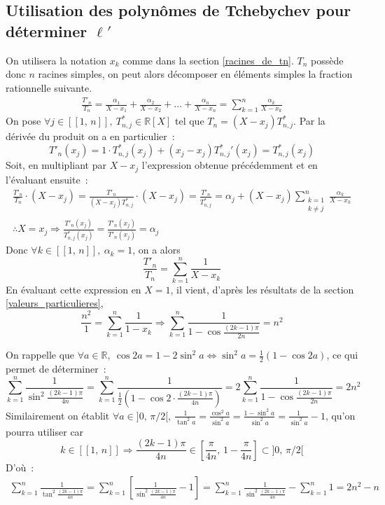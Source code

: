 \documentclass{article}
\begin{document}
  \subsection{Utilisation des polynômes de Tchebychev pour déterminer $\ell'$}
  On utilisera la notation $x_k$ comme dans la section \ref{racines_de_tn}. $T_n$ possède donc $n$ racines simples, on peut alors décomposer en éléments simples la fraction rationnelle suivante.
  \begin{align*}
    \frac{T'_n}{T_n} = \frac{\alpha_1}{X - x_1} + \frac{\alpha_2}{X - x_2} + \dots + \frac{\alpha_n}{X - x_n}
    = \sum_{k=1}^n \frac{\alpha_k}{X - x_k}
  \end{align*}
  On pose $\forall j\in[\![1,\, n]\!],\ T^*_{n,j}\in\mathbb{R}[X]$ tel que $T_n = (X - x_j)T^*_{n,j}$. Par la dérivée du produit on a en particulier~: \[T'_n(x_j) = 1\cdot T^*_{n,j}(x_j) + (x_j - x_j){T^*_{n,j}}'(x_j) = T^*_{n,j}(x_j)\]
  Soit, en multipliant par $X - x_j$ l'expression obtenue précédemment et en l'évaluant ensuite~:
  \begin{align*}
    \frac{T'_n}{T_n} \cdot (X - x_j) = \frac{T'_n}{(X - x_j)T^*_{n,j}} \cdot (X - x_j) = \frac{T'_n}{T^*_{n,j}}
    = \alpha_j + (X - x_j) \sum_{\substack{k=1 \\ k\neq j}}^n \frac{\alpha_k}{X - x_k} \\
    \therefore X = x_j \Longrightarrow \frac{T'_n(x_j)}{T^*_{n,j}(x_j)} = \frac{T'_n(x_j)}{T'_n(x_j)} = \alpha_j
  \end{align*}
  Donc $\forall k\in[\![1,\, n]\!],\ \alpha_k = 1$, on a alors
  \[
  \frac{T'_n}{T_n} = \sum_{k=1}^{n} \frac{1}{X - x_k}
  \]
  En évaluant cette expression en $X = 1$, il vient, d'après les résultats de la section \ref{valeurs_particulieres},
  \[
  \frac{n^2}{1} = \sum_{k=1}^n \frac{1}{1 - x_k} \Longrightarrow \sum_{k=1}^n \frac{1}{1 - \cos \frac{(2k - 1)\pi}{2n}} = n^2
  \]

  On rappelle que $\forall a\in\mathbb{R},\ \cos 2a = 1 - 2\sin^2 a \iff \sin^2 a = \frac{1}{2}\left(1 - \cos 2a \right)$, ce qui permet de déterminer~:
  \[
  \sum_{k=1}^n \frac{1}{\sin^2 \frac{(2k-1)\pi}{4n}} = \sum_{k=1}^n \frac{1}{\frac{1}{2}\left(1 - \cos 2\cdot\frac{(2k - 1)\pi}{4n}\right)} = 2 \sum_{k=1}^n \frac{1}{1 - \cos \frac{(2k - 1)\pi}{2n}} = 2n^2
  \]
  Similairement on établit $\forall a\in]0,\, \pi/2[,\ \frac{1}{\tan^2 a} = \frac{\cos^2 a}{\sin^2 a} = \frac{1 - \sin^2 a}{\sin^2 a} = \frac{1}{\sin^2 a} - 1$, qu'on pourra utiliser car
  \[
   k \in[\![1,\, n]\!] \Longrightarrow \frac{(2k - 1)\pi}{4n} \in \left[\frac{\pi}{4n},\, 1 - \frac{\pi}{4n}\right] \subset ]0,\, \pi/2[
  \]
  D'où~:
  \begin{align*}
    \sum_{k=1}^n \frac{1}{\tan^2 \frac{(2k-1)\pi}{4n}} = \sum_{k=1}^n \left[\frac{1}{\sin^2 \frac{(2k-1)\pi}{4n}} - 1\right] = \sum_{k=1}^n \frac{1}{\sin^2 \frac{(2k-1)\pi}{4n}} - \sum_{k=1}^n 1 = 2n^2 - n
  \end{align*}
\end{document}

